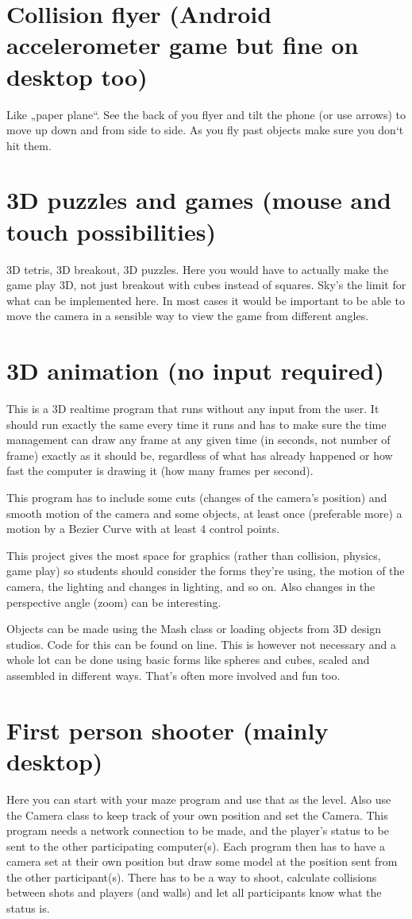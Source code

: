 \documentclass[12pt]{article}
\begin{document}
\section*{Collision flyer (Android accelerometer game but fine on desktop too)}
Like „paper plane“. See the back of you flyer and tilt the phone (or use arrows) to move up down and from side to side. As you fly past objects make sure you don‘t hit them.


\section*{3D puzzles and games (mouse and touch possibilities)}
3D tetris, 3D breakout, 3D puzzles. Here you would have to actually make the game play 3D, not just breakout with cubes instead of squares. Sky's the limit for what can be implemented here. In most cases it would be important to be able to move the camera in a sensible way to view the game from different angles.

\section*{3D animation (no input required)}
This is a 3D realtime program that runs without any input from the user. It should run exactly the same every time it runs and has to make sure the time management can draw any frame at any given time (in seconds, not number of frame) exactly as it should be, regardless of what has already happened or how fast the computer is drawing it (how many frames per second).

This program has to include some cuts (changes of the camera's position) and smooth motion of the camera and some objects, at least once (preferable more) a motion by a Bezier Curve with at least 4 control points.

This project gives the most space for graphics (rather than collision, physics, game play) so students should consider the forms they're using, the motion of the camera, the lighting and changes in lighting, and so on. Also changes in the perspective angle (zoom) can be interesting.

Objects can be made using the Mash class or loading objects from 3D design studios. Code for this can be found on line. This is however not necessary and a whole lot can be done using basic forms like spheres and cubes, scaled and assembled in different ways. That's often more involved and fun too.


\section*{First person shooter (mainly desktop)}
Here you can start with your maze program and use that as the level. Also use the Camera class to keep track of your own position and set the Camera. This program needs a network connection to be made, and the player's status to be sent to the other participating computer(s). Each program then has to have a camera set at their own position but draw some model at the position sent from the other participant(s). There has to be a way to shoot, calculate collisions between shots and players (and walls) and let all participants know what the status is.
\end{document}
